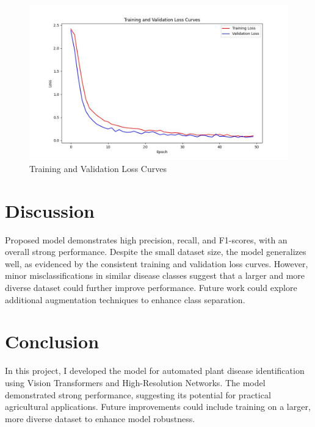 \documentclass[conference]{IEEEtran}
\begin{document}
\begin{figure}[h]
\centering
\includegraphics[width=1\linewidth]{loss_curves.jpg}
\caption{Training and Validation Loss Curves}
\label{fig:loss_curves}
\end{figure}

\section{Discussion}
Proposed model demonstrates high precision, recall, and F1-scores, with an overall strong performance. Despite the small dataset size, the model generalizes well, as evidenced by the consistent training and validation loss curves. However, minor misclassifications in similar disease classes suggest that a larger and more diverse dataset could further improve performance. Future work could explore additional augmentation techniques to enhance class separation.

\section{Conclusion}
In this project, I developed the model for automated plant disease identification using Vision Transformers and High-Resolution Networks. The model demonstrated strong performance, suggesting its potential for practical agricultural applications. Future improvements could include training on a larger, more diverse dataset to enhance model robustness.




\end{document}
